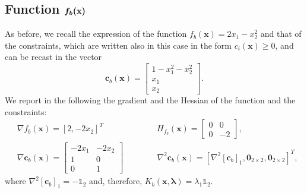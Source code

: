 \documentclass[a4paper,11pt]{article}
\begin{document}
\subsection*{Function $\boldmath{f_{b}}(\textbf{x})$}
As before, we recall the expression of the function $f_{b}(\textbf{x}) = 2x_{1} - x_{2}^{2}$ and that of the constraints, which are written also in this case in the form $c_{i}(\textbf{x})\ge0$, and can be recast in the vector
\begin{equation}
	\textbf{c}_{b}(\textbf{x}) = 
	\begin{bmatrix}
		1 -x_{1}^{2} - x_2^{2}\\
		x_1\\
		x_2
	\end{bmatrix}.
\end{equation}
We report in the following the gradient and the Hessian of the function and the constraints:
\begin{align}
	& \nabla f_{b}(\textbf{x}) = [2, -2x_{2}]^{T} \qquad \qquad \qquad \ \ H_{f_{b}}(\textbf{x}) = \begin{bmatrix}
		0 & 0 \\
		0 & -2
	\end{bmatrix}, \\
	& \nabla \textbf{c}_{b}(\textbf{x}) = \begin{bmatrix}
		-2x_{1} & - 2x_{2}\\
		1 & 0 \\
		0 & 1
	\end{bmatrix} \qquad \qquad \nabla^{2}{\textbf{c}_{b}}(\textbf{x}) =  \left[\nabla^{2}[\textbf{c}_{b}]_{1},\textbf{0}_{2\times2},\textbf{0}_{2\times2}\right]^{T},
\end{align}
where $\nabla^{2}[\textbf{c}_{b}]_{1} = -\mathbb{1}_{2}$ and, therefore, $K_{b}(\textbf{x},\boldsymbol{\lambda})=\lambda_{1}\mathbb{1}_{2}$.
\end{document}
